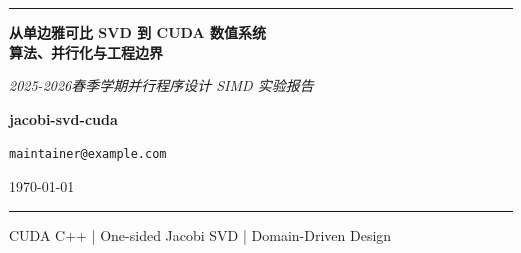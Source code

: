 ﻿\documentclass[11pt,a4paper]{article}
\makeatletter
\newcommand{\DocTitle}{从单边雅可比 SVD 到 CUDA 数值系统\\[0.35em]算法、并行化与工程边界}
\newcommand{\DocSubtitle}{2025-2026春季学期并行程序设计 SIMD 实验报告}
\newcommand{\DocAuthor}{jacobi-svd-cuda}
\newcommand{\DocEmail}{maintainer@example.com}
\newcommand{\DocDate}{\today}
\makeatother
\begin{document}
\begin{titlepage}
    \thispagestyle{empty}
    \centering

    \vspace*{2.2cm}
    {\color{blue!45!black}\rule{0.86\textwidth}{0.9pt}\par}
    \vspace{1.35cm}

    {\parbox{0.82\textwidth}{
            \centering
            \bfseries\color{blue!60!black}
            \setlength{\baselineskip}{1.42\baselineskip}
            \DocTitle\par
        }}

    \vspace{1.0cm}
    {\large\itshape\color{black!68}\DocSubtitle\par}

    \vfill

    \colorbox{blue!6}{
        \parbox{0.86\textwidth}{
            \centering
            \vspace{0.6cm}
            \vspace{0.25cm}
            {\Large\bfseries\DocAuthor\par}
            \vspace{0.15cm}
            {\normalsize\texttt{\DocEmail}\par}
            \vspace{0.45cm}
            {\normalsize\textsf{\DocDate}\par}
            \vspace{0.6cm}
        }
    }

    \vfill
    {\color{blue!35!black}\rule{0.86\textwidth}{0.9pt}\par}
    \vspace{0.35cm}
    {\small\textsf{CUDA C++ | One-sided Jacobi SVD | Domain-Driven Design}\par}
\end{titlepage}

\newpage
\end{document}
